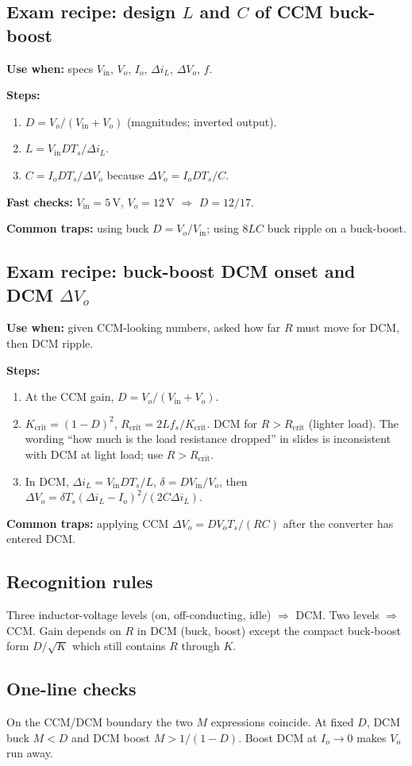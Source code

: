 \subsection{Exam recipe: design \(L\) and \(C\) of CCM buck-boost}
\textbf{Use when:} specs \(V_{\mathrm{in}}\), \(V_o\), \(I_o\), \(\Delta i_L\), \(\Delta V_o\), \(f\).

\textbf{Steps:}
\begin{enumerate}
  \item \(D=V_o/(V_{\mathrm{in}}+V_o)\) (magnitudes; inverted output).
  \item \(L=V_{\mathrm{in}} D T_s/\Delta i_L\).
  \item \(C=I_o D T_s/\Delta V_o\) because \(\Delta V_o=I_o D T_s/C\).
\end{enumerate}

\textbf{Fast checks:} \(V_{\mathrm{in}}=5\,\mathrm{V}\), \(V_o=12\,\mathrm{V}\) \(\Rightarrow\) \(D=12/17\).

\textbf{Common traps:} using buck \(D=V_o/V_{\mathrm{in}}\); using \(8LC\) buck ripple on a buck-boost.

\subsection{Exam recipe: buck-boost DCM onset and DCM \(\Delta V_o\)}
\textbf{Use when:} given CCM-looking numbers, asked how far \(R\) must move for DCM, then DCM ripple.

\textbf{Steps:}
\begin{enumerate}
  \item At the CCM gain, \(D=V_o/(V_{\mathrm{in}}+V_o)\).
  \item \(K_{\mathrm{crit}}=(1-D)^2\), \(R_{\mathrm{crit}}=2L f_s/K_{\mathrm{crit}}\). DCM for \(R>R_{\mathrm{crit}}\) (lighter load). The wording ``how much is the load resistance dropped'' in slides is inconsistent with DCM at light load; use \(R>R_{\mathrm{crit}}\).
  \item In DCM, \(\Delta i_L=V_{\mathrm{in}} D T_s/L\), \(\delta=D V_{\mathrm{in}}/V_o\), then \(\Delta V_o=\delta T_s(\Delta i_L-I_o)^2/(2C\Delta i_L)\).
\end{enumerate}

\textbf{Common traps:} applying CCM \(\Delta V_o=D V_o T_s/(RC)\) after the converter has entered DCM.

\subsection{Recognition rules}
Three inductor-voltage levels (on, off-conducting, idle) \(\Rightarrow\) DCM. Two levels \(\Rightarrow\) CCM. Gain depends on \(R\) in DCM (buck, boost) except the compact buck-boost form \(D/\sqrt{K}\) which still contains \(R\) through \(K\).

\subsection{One-line checks}
On the CCM/DCM boundary the two \(M\) expressions coincide. At fixed \(D\), DCM buck \(M<D\) and DCM boost \(M>1/(1-D)\). Boost DCM at \(I_o\to 0\) makes \(V_o\) run away.
